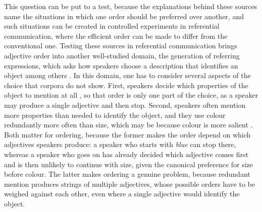 \documentclass[10pt,a4paper,fleqn]{article}
\begin{document}
This question can be put to a test, because the explanations behind these sources name the situations in which one order should be preferred over another, and such situations can be created in controlled experiments in referential communication, where the efficient order can be made to differ from the conventional one.
Testing these sources in referential communication brings adjective order into another well-studied domain, the generation of referring expressions, which asks how speakers choose a description that identifies an object among others \citep{dale1995computational,van2019conceptualization}.
In this domain, one has to consider several aspects of the choice that corpora do not show.
First, speakers decide which properties of the object to mention at all \citep{van2019conceptualization}, so that order is only one part of the choice, as a speaker may produce a single adjective and then stop.
Second, speakers often mention more properties than needed to identify the object, and they use colour redundantly more often than size, which may be because colour is more salient \citep{tarenskeen2015overspecification,rubio2016redundant,degen2020redundancy}.
Both matter for ordering, because the former makes the order depend on which adjectives speakers produce: a speaker who starts with \emph{blue} can stop there, whereas a speaker who goes on has already decided which adjective comes first and is then unlikely to continue with size, given the canonical preference for size before colour.
The latter makes ordering a genuine problem, because redundant mention produces strings of multiple adjectives, whose possible orders have to be weighed against each other, even where a single adjective would identify the object.
\end{document}

